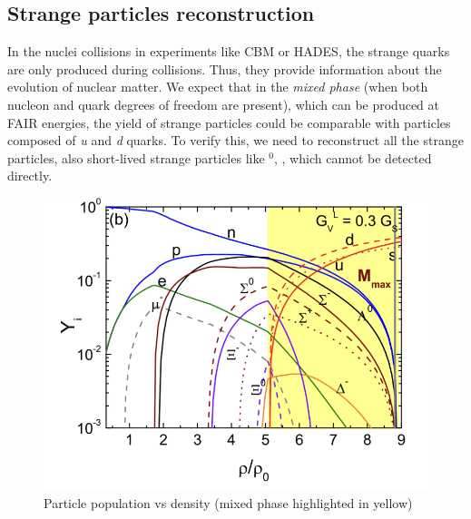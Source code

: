 \documentclass[12pt,a4paper]{report}
\begin{document}
\subsection{Strange particles reconstruction}
In the nuclei collisions in experiments like CBM or HADES, the strange quarks are only produced during collisions. Thus, they provide information about the evolution of nuclear matter. We expect \cite{deconfinement} that in the \emph{mixed phase} (when both nucleon and quark degrees of freedom are present), which can be produced at FAIR energies, the yield of strange particles could be comparable with particles composed of \emph{u} and \emph{d} quarks. To verify this, we need to reconstruct all the strange particles, also short-lived strange particles like \PLambda$^0$, \PXiminus, \PKshort which cannot be detected directly.

\begin{figure}[H]
    \centering
    \includegraphics[width=.6\textwidth]{images/mixed_phase.png}
    \caption{Particle population vs density (mixed phase highlighted in yellow) \cite{deconfinement}}
    \label{cbm_setup}
\end{figure}
\end{document}
